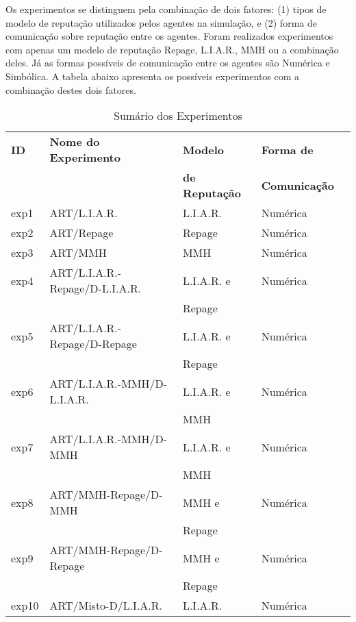 \documentclass[]{article}
\begin{document}
Os experimentos se distinguem pela combinação de dois fatores: (1) tipos de modelo de reputação utilizados pelos agentes na simulação, e (2) forma de comunicação sobre reputação entre os agentes. Foram realizados experimentos com apenas um modelo de reputação Repage, L.I.A.R., MMH ou a combinação deles. Já as formas possíveis de comunicação entre os agentes são Numérica e Simbólica. A tabela abaixo apresenta os possíveis experimentos com a combinação destes dois fatores.
%
\begin{table}[ht]
	\caption {Sumário dos Experimentos}
	\label{table:experiments}
	\begin{center}
	\begin{tabular}{|l|l|l|l|l|}
		\hline
			\textbf{ID} & \textbf{Nome do Experimento} & \textbf{Modelo} & \textbf{Forma de}\\
			         &                       & \textbf{de Reputação}      & \textbf{Comunicação}\\
		\hline
			exp1   & ART/L.I.A.R. & L.I.A.R. & Numérica\\
		\hline
			exp2   & ART/Repage & Repage & Numérica\\
		\hline
			exp3   & ART/MMH & MMH & Numérica\\
		\hline
			exp4   & ART/L.I.A.R.-Repage/D-L.I.A.R. & L.I.A.R. e & Numérica\\
			       &                                & Repage     & \\
		\hline
			exp5   & ART/L.I.A.R.-Repage/D-Repage & L.I.A.R. e & Numérica\\
			       &                              & Repage     & \\
		\hline
			exp6   & ART/L.I.A.R.-MMH/D-L.I.A.R. & L.I.A.R. e & Numérica\\
			       &                             & MMH        & \\
		\hline
			exp7   & ART/L.I.A.R.-MMH/D-MMH & L.I.A.R. e & Numérica\\
			       &                        & MMH        & \\
		\hline
			exp8   & ART/MMH-Repage/D-MMH & MMH e  & Numérica\\
			       &                      & Repage & \\
		\hline
			exp9   & ART/MMH-Repage/D-Repage & MMH e  & Numérica\\
			       &                         & Repage & \\
		\hline
			exp10  & ART/Misto-D/L.I.A.R. & L.I.A.R.   & Numérica\\

\end{tabular}
\end{center}
\end{table}
\end{document}
